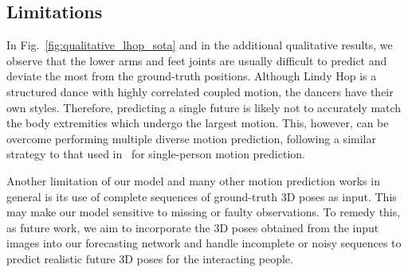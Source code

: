 \subsection{Limitations}
In Fig.~\ref{fig:qualitative_lhop_sota} and in the additional qualitative results, we observe that the lower arms and feet joints are usually difficult to predict and deviate the most from the ground-truth positions. Although Lindy Hop is a structured dance with highly correlated coupled motion, the dancers have their own styles. Therefore, predicting a single future is likely not to accurately match the body extremities which undergo the largest motion. This, however, can be overcome performing multiple diverse motion prediction, following a similar strategy to that used in~\cite{Yuan20,Aliakbarian21,Mao21b} for single-person motion prediction.

Another limitation of our model and many other motion prediction works in general is its use of complete sequences of ground-truth 3D poses as input. This may make our model sensitive to missing or faulty observations. To remedy this, as future work, we aim to incorporate the 3D poses obtained from the input images into our forecasting network and handle incomplete or noisy sequences to predict realistic future 3D poses for the interacting people.

